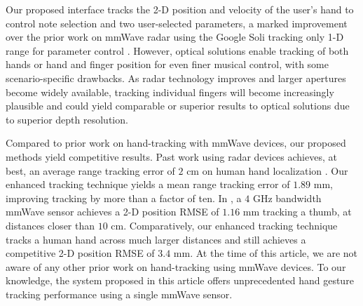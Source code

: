 \documentclass[10pt,journal,final]{IEEEtran}
\begin{document}
Our proposed interface tracks the 2-D position and velocity of the user's hand to control note selection and two user-selected parameters, a marked improvement over the prior work on mmWave radar using the Google Soli tracking only 1-D range for parameter control \cite{bernardo2017_o_soli_mio}. 
However, optical solutions enable tracking of both hands \cite{polfreman2011multi,jensenius2013kinectofon,hantrakul2014implementations,tompson2014real,ye2016spatial,sridhar2015fast,taylor2016efficient,oikonomidis2011efficient,tang2015opening} or hand and finger position \cite{han2014lessons,nieto2013hand} for even finer musical control, with some scenario-specific drawbacks. 
As radar technology improves and larger apertures become widely available, tracking individual fingers will become increasingly plausible and could yield comparable or superior results to optical solutions due to superior depth resolution.

Compared to prior work on hand-tracking with mmWave devices, our proposed methods yield competitive results.
Past work using radar devices achieves, at best, an average range tracking error of $2$ cm on human hand localization \cite{joshi2015wideo}. 
Our enhanced tracking technique yields a mean range tracking error of $1.89$ mm, improving tracking by more than a factor of ten.
In \cite{li2020thumouse}, a $4$ GHz bandwidth mmWave sensor achieves a 2-D position RMSE of $1.16$ mm tracking a thumb, at distances closer than $10$ cm.
Comparatively, our enhanced tracking technique tracks a human hand across much larger distances and still achieves a competitive 2-D position RMSE of $3.4$ mm. 
At the time of this article, we are not aware of any other prior work on hand-tracking using mmWave devices. 
To our knowledge, the system proposed in this article offers unprecedented hand gesture tracking performance using a single mmWave sensor.
\end{document}
